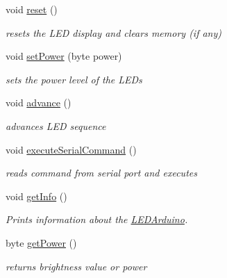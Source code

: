 \begin{DoxyCompactItemize}
void \hyperlink{class_l_e_d_arduino_a1b1d363f04adabc75cdc76a00fb3aa49}{reset} ()
\begin{DoxyCompactList}\small\item\em resets the L\+ED display and clears memory (if any) \end{DoxyCompactList}\item 
void \hyperlink{class_l_e_d_arduino_a1972cc7d80383adc42e910ecb13ffbb2}{set\+Power} (byte power)
\begin{DoxyCompactList}\small\item\em sets the power level of the L\+E\+Ds \end{DoxyCompactList}\item 
\mbox{\label{class_l_e_d_arduino_a6b00a5f83bf0a8036507cf1ecc051f62}} 
void \hyperlink{class_l_e_d_arduino_a6b00a5f83bf0a8036507cf1ecc051f62}{advance} ()
\begin{DoxyCompactList}\small\item\em advances L\+ED sequence \end{DoxyCompactList}\item 
\mbox{\label{class_l_e_d_arduino_ab98aa213027e69644f33bf62908a2a01}} 
void \hyperlink{class_l_e_d_arduino_ab98aa213027e69644f33bf62908a2a01}{execute\+Serial\+Command} ()
\begin{DoxyCompactList}\small\item\em reads command from serial port and executes \end{DoxyCompactList}\item 
\mbox{\label{class_l_e_d_arduino_a7aa1f5ce82ced1dea2e23ee14469dbef}} 
void \hyperlink{class_l_e_d_arduino_a7aa1f5ce82ced1dea2e23ee14469dbef}{get\+Info} ()
\begin{DoxyCompactList}\small\item\em Prints information about the \hyperlink{class_l_e_d_arduino}{L\+E\+D\+Arduino}. \end{DoxyCompactList}\item 
byte \hyperlink{class_l_e_d_arduino_a11aaec881a1e6e1a1f4cff814dc252ea}{get\+Power} ()
\begin{DoxyCompactList}\small\item\em returns brightness value or power \end{DoxyCompactList}\end{DoxyCompactItemize}


